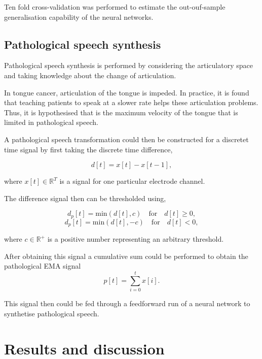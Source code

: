 \documentclass[a4paper]{article}
\begin{document}
Ten fold cross-validation was performed to estimate the out-ouf-sample
generalisation capability of the neural networks.

\subsection{Pathological speech synthesis}

Pathological speech synthesis is performed by considering the articulatory
space and taking knowledge about the change of articulation.

In tongue cancer, articulation of the tongue is impeded. In practice,
it is found that teaching patients to speak at a slower rate helps these
articulation problems. Thus, it is hypothesised that is the maximum
velocity of the tongue that is limited in pathological speech.

A pathological speech transformation could then be constructed for
a discretet time signal by first taking the discrete time difference,

\begin{equation}
  d[t] = x[t] - x[t-1],
  \label{eq1}
\end{equation}

where \( x[t] \in \mathbb{R}^T \) is a signal for one particular electrode channel.

The difference signal then can be thresholded using,

\begin{equation}
  d_p[t] = \text{min}(d[t],c) \quad \text{for} \quad d[t] \geq 0, 
  \label{eq2}
\end{equation}
\begin{equation}
  d_p[t] = \text{min}(d[t],-c) \quad \text{for} \quad d[t] < 0,
  \label{eq3}
\end{equation}

where \( c \in \mathbb{R}^{+} \) is a positive number representing an
arbitrary threshold.

After obtaining this signal a cumulative sum could be performed to obtain
the pathological EMA signal
\begin{equation}
  p[t] = \sum_{i=0}^{t} x[i].
  \label{eq4}
\end{equation}

This signal then could be fed through a feedforward run of a neural network
to synthetise pathological speech.

\section{Results and discussion}
\end{document}
